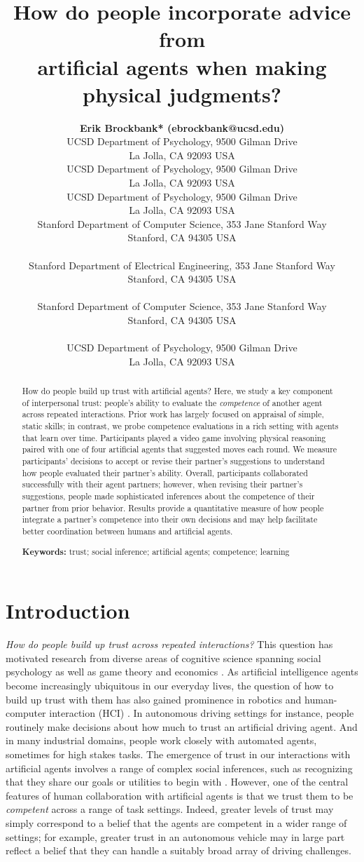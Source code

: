 \documentclass[10pt,letterpaper]{article}
\title{How do people incorporate advice from\\ artificial agents when making physical judgments?}
\author{
  {
  \large \bf Erik Brockbank* (ebrockbank@ucsd.edu)} \\
  UCSD Department of Psychology, 9500 Gilman Drive \\
  La Jolla, CA 92093 USA
  \AND {\large \bf Haoliang Wang* (haw027@ucsd.edu)} \\
  UCSD Department of Psychology, 9500 Gilman Drive \\
  La Jolla, CA 92093 USA
  \AND {\large \bf Justin Yang (juy003@ucsd.edu)} \\
  UCSD Department of Psychology, 9500 Gilman Drive \\
  La Jolla, CA 92093 USA
  \AND {\large \bf Suvir Mirchandani (suvir@cs.stanford.edu)} \\
  Stanford Department of Computer Science, 353 Jane Stanford Way \\
  Stanford, CA 94305 USA \\
  \AND {\large \bf Erdem B{\i}y{\i}k (ebiyik@stanford.edu)} \\
  Stanford Department of Electrical Engineering, 353 Jane Stanford Way \\
  Stanford, CA 94305 USA \\
  \AND {\large \bf Dorsa Sadigh (dorsa@cs.stanford.edu)} \\
  Stanford Department of Computer Science, 353 Jane Stanford Way \\
  Stanford, CA 94305 USA \\
  \AND {\large \bf Judith Fan (jefan@ucsd.edu)} \\
  UCSD Department of Psychology, 9500 Gilman Drive \\
  La Jolla, CA 92093 USA \\
}
\begin{document}
\maketitle


\begin{abstract}
How do people build up trust with artificial agents? Here, we study a key component of interpersonal trust: people's ability to evaluate the \textit{competence} of another agent across repeated interactions. Prior work has largely focused on appraisal of simple, static skills; in contrast, we probe competence evaluations in a rich setting with agents that learn over time. Participants played a video game involving physical reasoning paired with one of four artificial agents that suggested moves each round. We measure participants' decisions to accept or revise their partner's suggestions to understand how people evaluated their partner's ability. Overall, participants collaborated successfully with their agent partners; however, when revising their partner's suggestions, people made sophisticated inferences about the competence of their partner from prior behavior. Results provide a quantitative measure of how people integrate a partner's competence into their own decisions and may help facilitate better coordination between humans and artificial agents.

\textbf{Keywords:} 
trust; social inference; artificial agents; competence; learning 
\end{abstract}



\section{Introduction}

\textit{How do people build up trust across repeated interactions?} This question has motivated research from diverse areas of cognitive science spanning social psychology \cite{simpson2007psychological, deutsch1973resolution} as well as game theory and economics \cite{camerer1988experimental, berg1995trust}. As artificial intelligence agents become increasingly ubiquitous in our everyday lives, the question of how to build up trust with them has also gained prominence in robotics and human-computer interaction (HCI) \cite{soh2020multi, chen2020trust}. 
In autonomous driving settings for instance, people routinely make decisions about how much to trust an artificial driving agent. And in many industrial domains, people work closely with automated agents, sometimes for high stakes tasks. The emergence of trust in our interactions with artificial agents involves a range of complex social inferences, such as recognizing that they share our goals or utilities to begin with \cite{serrino2019finding}. However, one of the central features of human collaboration with artificial agents is that we trust them to be \textit{competent} across a range of task settings. Indeed, greater levels of trust may simply correspond to a belief that the agents are competent in a wider range of settings; for example, greater trust in an autonomous vehicle may in large part reflect a belief that they can handle a suitably broad array of driving challenges.
\end{document}
